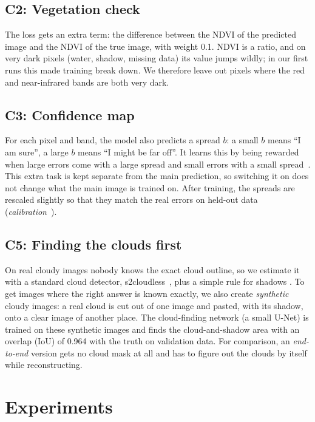 \documentclass[conference]{IEEEtran}
\begin{document}
\subsection{C2: Vegetation check}
The loss gets an extra term: the difference between the NDVI of the predicted image and the NDVI
of the true image, with weight 0.1. NDVI is a ratio, and on very dark pixels (water, shadow,
missing data) its value jumps wildly; in our first runs this made training break down. We
therefore leave out pixels where the red and near-infrared bands are both very dark.

\subsection{C3: Confidence map}
For each pixel and band, the model also predicts a spread $b$: a small $b$ means ``I am sure'',
a large $b$ means ``I might be far off''. It learns this by being rewarded when large errors come
with a large spread and small errors with a small spread~\cite{kendall2017uncertainties}. This
extra task is kept separate from the main prediction, so switching it on does not change what the
main image is trained on. After training, the spreads are rescaled slightly so that they match the
real errors on held-out data (\emph{calibration}~\cite{guo2017calibration}).

\subsection{C5: Finding the clouds first}
On real cloudy images nobody knows the exact cloud outline, so we estimate it with a standard
cloud detector, s2cloudless~\cite{zupanc2017s2cloudless}, plus a simple rule for shadows
\cite{zhai2018cloudshadow}. To get images where the right answer is known exactly, we also create
\emph{synthetic} cloudy images: a real cloud is cut out of one image and pasted, with its shadow,
onto a clear image of another place. The cloud-finding network (a small U-Net) is trained on these
synthetic images and finds the cloud-and-shadow area with an overlap (IoU) of 0.964 with the truth
on validation data. For comparison, an \emph{end-to-end} version gets no cloud mask at all and has
to figure out the clouds by itself while reconstructing.

\section{Experiments}
\end{document}
